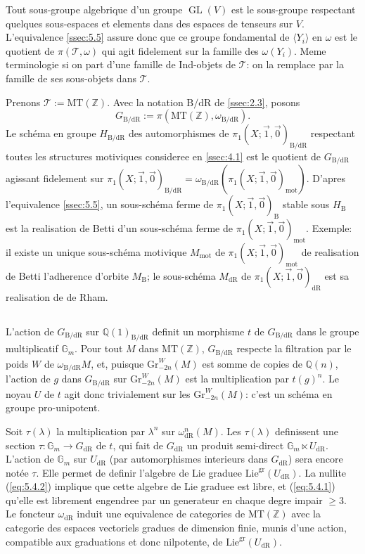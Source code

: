 \documentclass[11pt,a4paper]{article}
\theoremstyle{plain}
\theoremstyle{definition}
\DeclareMathOperator{\GL}{GL}
\newcommand{\Z}{\mathbb{Z}}
\newcommand{\Q}{\mathbb{Q}}
\newcommand{\Gm}{\mathbb{G}_m}
\newcommand{\dR}{\mathrm{dR}}
\newcommand{\B}{\mathrm{B}}
\newcommand{\mot}{\mathrm{mot}}
\newcommand{\gr}{\mathrm{gr}}
\newcommand{\Gr}{\mathrm{Gr}}
\newcommand{\MT}{\mathrm{MT}}
\begin{document}
Tout sous-groupe algebrique d'un groupe $\GL(V)$ est le sous-groupe respectant quelques sous-espaces et elements dans des espaces de tenseurs sur $V$. L'equivalence \ref{ssec:5.5} assure donc que ce groupe fondamental de $\langle Y_i \rangle$ en $\omega$ est le quotient de $\pi(\mathcal{T},\omega)$ qui agit fidelement sur la famille des $\omega(Y_i)$. Meme terminologie si on part d'une famille de Ind-objets de $\mathcal{T}$: on la remplace par la famille de ses sous-objets dans $\mathcal{T}$.

Prenons $\mathcal{T} := \MT(\Z)$. Avec la notation $\B/\dR$ de \ref{ssec:2.3}, posons
\begin{equation}\label{eq:5.6.1}
G_{\B/\dR} := \pi(\MT(\Z), \omega_{\B/\dR}).
\end{equation}
Le sch\'ema en groupe $H_{\B/\dR}$ des automorphismes de $\pi_1(X;\vec{1},\vec{0})_{\B/\dR}$ respectant toutes les structures motiviques consideree en \ref{ssec:4.1} est le quotient de $G_{\B/\dR}$ agissant fidelement sur $\pi_1(X;\vec{1},\vec{0})_{\B/\dR} = \omega_{\B/\dR}(\pi_1(X;\vec{1},\vec{0})_{\mot})$. D'apres l'equivalence \ref{ssec:5.5}, un sous-sch\'ema ferme de $\pi_1(X;\vec{1},\vec{0})_{\B}$ stable sous $H_{\B}$ est la realisation de Betti d'un sous-sch\'ema ferme de $\pi_1(X;\vec{1},\vec{0})_{\mot}$. Exemple: il existe un unique sous-sch\'ema motivique $M_{\mot}$ de $\pi_1(X;\vec{1},\vec{0})_{\mot}$ de realisation de Betti l'adherence d'orbite $M_{\B}$; le sous-sch\'ema $M_{\dR}$ de $\pi_1(X;\vec{1},\vec{0})_{\dR}$ est sa realisation de de Rham.

\subsection{}\label{ssec:5.7}

L'action de $G_{\B/\dR}$ sur $\Q(1)_{\B/\dR}$ definit un morphisme $t$ de $G_{\B/\dR}$ dans le groupe multiplicatif $\Gm$. Pour tout $M$ dans $\MT(\Z)$, $G_{\B/\dR}$ respecte la filtration par le poids $W$ de $\omega_{\B/\dR} M$, et, puisque $\Gr^W_{-2n}(M)$ est somme de copies de $\Q(n)$, l'action de $g$ dans $G_{\B/\dR}$ sur $\Gr^W_{-2n}(M)$ est la multiplication par $t(g)^n$. Le noyau $U$ de $t$ agit donc trivialement sur les $\Gr^W_{-2n}(M)$: c'est un sch\'ema en groupe pro-unipotent.

Soit $\tau(\lambda)$ la multiplication par $\lambda^n$ sur $\omega_{\dR}^n(M)$. Les $\tau(\lambda)$ definissent une section $\tau: \Gm \to G_{\dR}$ de $t$, qui fait de $G_{\dR}$ un produit semi-direct $\Gm \ltimes U_{\dR}$. L'action de $\Gm$ sur $U_{\dR}$ (par automorphismes interieurs dans $G_{\dR}$) sera encore not\'ee $\tau$. Elle permet de definir l'algebre de Lie graduee $\mathrm{Lie}^{\gr}(U_{\dR})$. La nullite (\ref{eq:5.4.2}) implique que cette algebre de Lie graduee est libre, et (\ref{eq:5.4.1}) qu'elle est librement engendree par un generateur en chaque degre impair $\geq 3$. Le foncteur $\omega_{\dR}$ induit une equivalence de categories de $\MT(\Z)$ avec la categorie des espaces vectoriels gradues de dimension finie, munis d'une action, compatible aux graduations et donc nilpotente, de $\mathrm{Lie}^{\gr}(U_{\dR})$.
\end{document}
